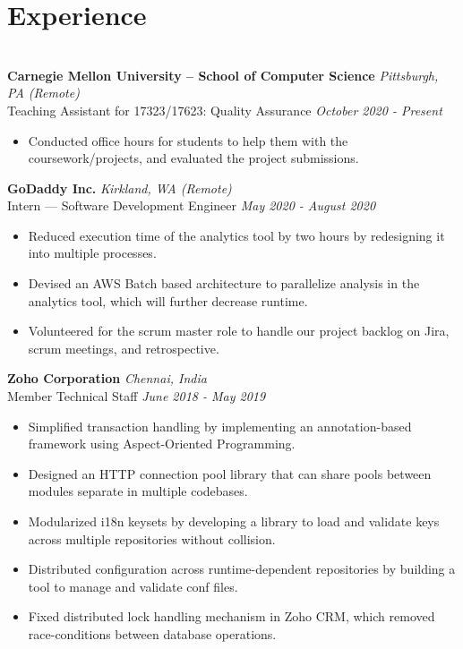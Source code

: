 \documentclass{resume}
\begin{document}
\section*{Experience}
\titlerule
\noindent
\\
\textbf{Carnegie Mellon University -- School of Computer Science} \hfill \textit{Pittsburgh, PA (Remote)} \\
{\small Teaching Assistant for 17323/17623: Quality Assurance} \hfill \textit{\small October 2020 - Present}
\begin{itemize}
  \item Conducted office hours for students to help them with the coursework/projects, and evaluated the project submissions.
\end{itemize}
\textbf{GoDaddy Inc.} \hfill \textit{Kirkland, WA (Remote)} \\
{\small Intern --- Software Development Engineer} \hfill \textit{\small May 2020 - August 2020}
\begin{itemize}
  \item Reduced execution time of the analytics tool by two hours by redesigning it into multiple processes.
  \item Devised an AWS Batch based architecture to parallelize analysis in the analytics tool, which will further decrease runtime.
  \item Volunteered for the scrum master role to handle our project backlog on Jira, scrum meetings, and retrospective.
\end{itemize}
\textbf{Zoho Corporation} \hfill \textit{Chennai, India} \\
{\small Member Technical Staff} \hfill \textit{\small June 2018 - May 2019}
\begin{itemize}
  \item Simplified transaction handling by implementing an annotation-based framework using Aspect-Oriented Programming.
  \item Designed an HTTP connection pool library that can share pools between modules separate in multiple codebases.
  \item Modularized i18n keysets by developing a library to load and validate keys across multiple repositories without collision.
  \item Distributed configuration across runtime-dependent repositories by building a tool to manage and validate conf files.
  \item Fixed distributed lock handling mechanism in Zoho CRM, which removed race-conditions between database operations.
\end{itemize}
\end{document}
